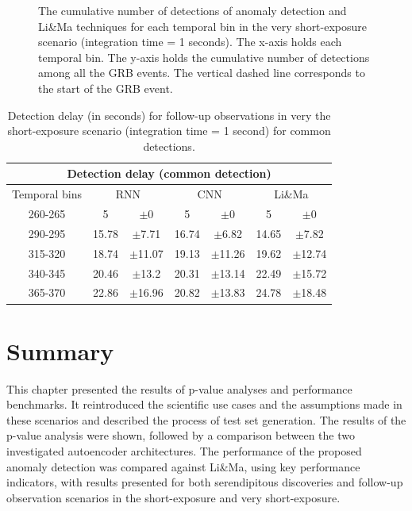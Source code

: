 \begin{figure}[!ht]
\centering

\captionsetup{width=1\linewidth}
\caption{The cumulative number of detections of anomaly detection and Li\&Ma techniques for each temporal bin in the very short-exposure scenario (integration time = 1 seconds). The x-axis holds each temporal bin. The y-axis holds the cumulative number of detections among all the GRB events. The vertical dashed line corresponds to the start of the GRB event.}
\label{fig:follow-up-itime-1}
\end{figure}


\begin{table}[!ht]
\centering
\begin{tabular}{|c|cc|cc|cc|} 
\hline
\multicolumn{7}{|c|}{\textbf{Detection delay} (common detection)} \\ 
\hline
\multicolumn{1}{|c|}{Temporal bins} & \multicolumn{2}{c|}{RNN} & \multicolumn{2}{c|}{CNN} & \multicolumn{2}{c|}{Li\&Ma} \\ 
\hline
260-265 & 5 &  $\pm$0 & 5 &  $\pm$0 & 5 &  $\pm$0 \\
290-295&15.78&$\pm$7.71&16.74&$\pm$6.82&14.65&$\pm$7.82\\
315-320&18.74&$\pm$11.07&19.13&$\pm$11.26&19.62&$\pm$12.74\\
340-345&20.46&$\pm$13.2&20.31&$\pm$13.14&22.49&$\pm$15.72\\
365-370&22.86&$\pm$16.96&20.82&$\pm$13.83&24.78&$\pm$18.48\\
\hline
\end{tabular}
\caption{Detection delay (in seconds) for follow-up observations in very the short-exposure scenario (integration time = 1 second) for common detections.}
\label{tab:dd-follow-up-itime-1-common}
\end{table}

\FloatBarrier
\section{Summary}
This chapter presented the results of p-value analyses and performance benchmarks. It reintroduced the scientific use cases and the assumptions made in these scenarios and described the process of test set generation. The results of the p-value analysis were shown, followed by a comparison between the two investigated autoencoder architectures. The performance of the proposed anomaly detection was compared against Li\&Ma, using key performance indicators, with results presented for both serendipitous discoveries and follow-up observation scenarios in the short-exposure and very short-exposure.